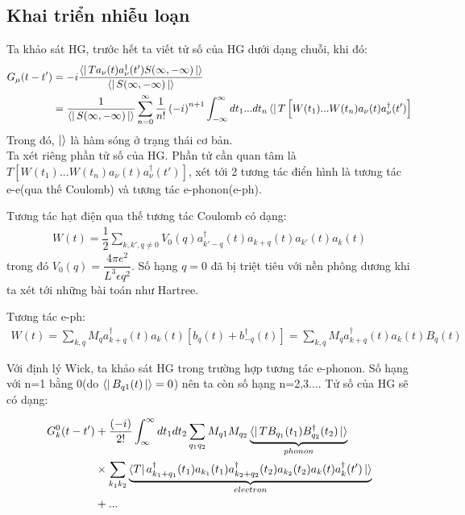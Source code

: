 \documentclass{report}
\begin{document}
\subsection{Khai triển nhiễu loạn}
Ta khảo sát HG, trước hết ta viết tử số của HG dưới dạng chuỗi, khi đó:
\begin{align}
	G_{\mu}(t-t') & = -i \dfrac{\bra{}Ta_{\nu}(t)a_{\nu}^{\dagger}(t')S(\infty,-\infty)\ket{}}{\bra{} S(\infty,-\infty)\ket{}} \nonumber                                                                                      \\
	              & = \dfrac{1}{{\bra{} S(\infty,-\infty)\ket{}}}\sum_{n=0}^{\infty}\dfrac{1}{n!}\left( -i \right)^{n+1}\int_{-\infty}^{\infty}dt_1...dt_n\bra{}T\left[ W(t_1)...W(t_n)a_{\nu}(t)a_{\nu}^{\dagger}(t')\right]
\end{align}
Trong đó, $\ket{}$ là hàm sóng ở trạng thái cơ bản.\\
Ta xét riêng phần tử số của HG. Phần tử cần quan tâm là $T\left[ W(t_1)...W(t_n)a_{\nu}(t)a_{\nu}^{\dagger}(t')\right]$, xét tới 2 tương tác điển hình là tương tác e-e(qua thế Coulomb) và tương tác e-phonon(e-ph).

Tương tác hạt điện qua thế tương tác Coulomb có dạng:
\begin{align}
	W(t) = \dfrac{1}{2} \displaystyle\sum_{k,k',q\neq0}^{}V_0(q)a^{\dagger}_{k'-q}(t)a_{k+q}(t)a_{k'}(t)a_{k}(t)
\end{align}
trong đó $V_0(q) = \dfrac{4\pi e^2}{L^3\epsilon q^2}$. Số hạng $q = 0$ đã bị triệt tiêu với nền phông dương khi ta xét tới những bài toán như Hartree.

Tương tác e-ph:
\begin{align}
	W(t) = \sum_{k,q}^{}M_q a_{k+q}^{\dagger}(t)a_{k}(t)\left[ b_q(t)+b_{-q}^{\dagger}(t) \right] = \sum_{k,q}^{}M_q a_{k+q}^{\dagger}(t)a_{k}(t) B_q(t)
\end{align}

Với định lý Wick, ta khảo sát HG trong trường hợp tương tác e-phonon. Số hạng với n=1 bằng 0(do $\bra{}B_{q1}(t)\ket{} = 0$) nên ta còn số hạng n=2,3.... Tử số của HG sẽ có dạng:

\begin{align}
	G_{k}^{0}(t-t') & + \dfrac{\left( -i \right)}{2!}\int_{\infty}^{\infty}dt_1 dt_2\sum_{q_1q_2}M_{q1}M_{q_2}\underbrace{\bra{}TB_{q_1}(t_1)B^{\dagger}_{q_2}(t_2)\ket{}}_{phonon} \nonumber \\
	                & \times \sum_{k_1 k_2}\underbrace{\bra Ta^{\dagger}_{k_1 + q_1}(t_1)a_{k_1}(t_1)a^{\dagger}_{k_2 + q_2}(t_2)a_{k_2}(t_2)a_{k}(t)a^{\dagger}_{k}(t')\ket{}}_{electron}    \\
	                & + ... \nonumber
\end{align}
\end{document}
